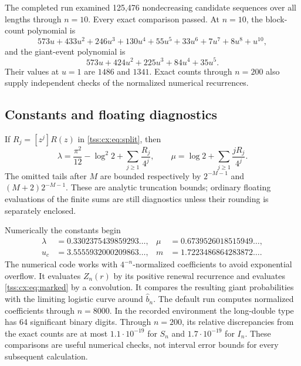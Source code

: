 \documentclass[11pt]{article}
\theoremstyle{remark}\newtheorem{remark}[theorem]{Remark}
\theoremstyle{definition}\newtheorem{definition}[theorem]{Definition}
\begin{document}
The completed run examined 125,476 nondecreasing candidate sequences
over all lengths through $n=10$. Every exact comparison passed.
At $n=10$, the block-count polynomial is
\[
 573u+433u^2+246u^3+130u^4+55u^5+33u^6+7u^7+8u^8+u^{10},
\]
and the giant-event polynomial is
\[
 573u+424u^2+225u^3+84u^4+35u^5.
\]
Their values at $u=1$ are $1486$ and $1341$. Exact counts through
$n=200$ also supply independent checks of the normalized numerical
recurrences.

\subsection{Constants and floating diagnostics}
If $R_j=[z^j]R(z)$ in \eqref{tss:cx:eq:split}, then
\begin{equation}\label{tss:cx:eq:constantcompute}
 \lambda=\frac{\pi^2}{12}-\log^2 2+\sum_{j\ge1}\frac{R_j}{4^j},
 \qquad
 \mu=\log2+\sum_{j\ge1}\frac{jR_j}{4^j}.
\end{equation}
The omitted tails after $M$ are bounded respectively by
$2^{-M-1}$ and $(M+2)2^{-M-1}$. These are analytic truncation bounds;
ordinary floating evaluations of the finite sums are still
diagnostics unless their rounding is separately enclosed.

Numerically the constants begin
\[
 \begin{aligned}
 \lambda&=0.3302375439859293\ldots,&
 \mu&=0.6739526018515949\ldots,\\
 u_c&=3.5555932000209863\ldots,&
 m&=1.7223486864283872\ldots.
 \end{aligned}
\]
The numerical code works with $4^{-n}$-normalized coefficients to
avoid exponential overflow. It evaluates $Z_n(r)$ by its positive
renewal recurrence and evaluates \eqref{tss:cx:eq:marked} by a convolution.
It compares the resulting giant probabilities with the limiting
logistic curve around $\widehat b_n$. The default run computes
normalized coefficients through $n=8000$. In the recorded environment
the long-double type has 64 significant binary digits. Through
$n=200$, its relative discrepancies from the exact counts are at
most $1.1\cdot10^{-19}$ for $S_n$ and $1.7\cdot10^{-19}$ for $I_n$.
These comparisons are useful numerical checks, not interval error
bounds for every subsequent calculation.
\end{document}
